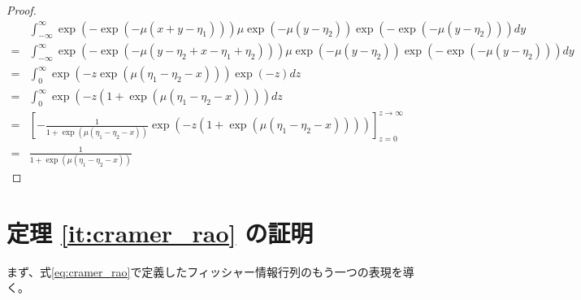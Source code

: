 \begin{proof}
    \begin{equation}
        \begin{aligned}
              & \int_{-\infty}^{\infty} \exp(-\exp(-\mu(x+y-\eta_1)))\mu \exp(-\mu (y-\eta_2)) \exp(-\exp(-\mu (y-\eta_2)))dy               \\
            = & \int_{-\infty}^{\infty} \exp(-\exp(-\mu(y-\eta_2+x-\eta_1+\eta_2)))\mu \exp(-\mu (y-\eta_2)) \exp(-\exp(-\mu (y-\eta_2)))dy \\
            = & \int_{0}^{\infty} \exp(-z\exp(\mu(\eta_1-\eta_2-x))) \exp(-z)dz                                                             \\
            = & \int_{0}^{\infty} \exp(-z(1+\exp(\mu(\eta_1-\eta_2-x))))dz                                                                  \\
            = & \left[-\frac{1}{1+\exp(\mu(\eta_1-\eta_2-x))} \exp(-z(1+\exp(\mu(\eta_1-\eta_2-x))))\right]_{z=0}^{z \to\infty}             \\
            = & \frac{1}{1+\exp(\mu(\eta_1-\eta_2-x))}
        \end{aligned}
    \end{equation}
\end{proof}

\section{定理 \ref{it:cramer_rao} の証明}

まず、式\ref{eq:cramer_rao}で定義したフィッシャー情報行列のもう一つの表現を導く。

